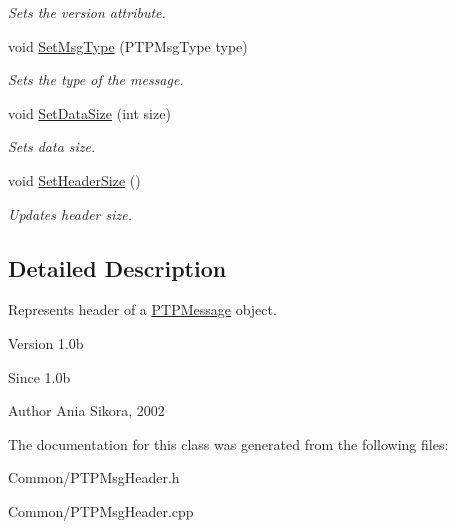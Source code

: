 \begin{DoxyCompactItemize}
\begin{DoxyCompactList}\small\item\em Sets the version attribute. \end{DoxyCompactList}\item 
\hypertarget{class_common_1_1_p_t_p_msg_header_a58c7cee7c62009708b434779ab4324d6}{void \hyperlink{class_common_1_1_p_t_p_msg_header_a58c7cee7c62009708b434779ab4324d6}{Set\-Msg\-Type} (P\-T\-P\-Msg\-Type type)}\label{class_common_1_1_p_t_p_msg_header_a58c7cee7c62009708b434779ab4324d6}

\begin{DoxyCompactList}\small\item\em Sets the type of the message. \end{DoxyCompactList}\item 
\hypertarget{class_common_1_1_p_t_p_msg_header_aa87797fce32bafab7600a848eb6c5156}{void \hyperlink{class_common_1_1_p_t_p_msg_header_aa87797fce32bafab7600a848eb6c5156}{Set\-Data\-Size} (int size)}\label{class_common_1_1_p_t_p_msg_header_aa87797fce32bafab7600a848eb6c5156}

\begin{DoxyCompactList}\small\item\em Sets data size. \end{DoxyCompactList}\item 
\hypertarget{class_common_1_1_p_t_p_msg_header_a43c32c543abe16528f1398a4a1c21f8f}{void \hyperlink{class_common_1_1_p_t_p_msg_header_a43c32c543abe16528f1398a4a1c21f8f}{Set\-Header\-Size} ()}\label{class_common_1_1_p_t_p_msg_header_a43c32c543abe16528f1398a4a1c21f8f}

\begin{DoxyCompactList}\small\item\em Updates header size. \end{DoxyCompactList}\end{DoxyCompactItemize}


\subsection{Detailed Description}
Represents header of a \hyperlink{class_common_1_1_p_t_p_message}{P\-T\-P\-Message} object. 

\begin{DoxyVersion}{Version}
1.\-0b 
\end{DoxyVersion}
\begin{DoxySince}{Since}
1.\-0b 
\end{DoxySince}
\begin{DoxyAuthor}{Author}
Ania Sikora, 2002 
\end{DoxyAuthor}


The documentation for this class was generated from the following files\-:\begin{DoxyCompactItemize}
\item 
Common/P\-T\-P\-Msg\-Header.\-h\item 
Common/P\-T\-P\-Msg\-Header.\-cpp\end{DoxyCompactItemize}
